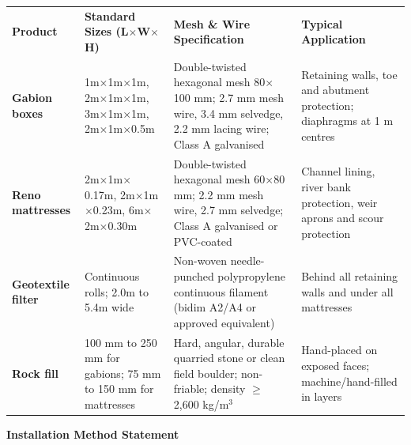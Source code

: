 {\fontsize{7.4pt}{9.0pt}\selectfont
\renewcommand{\arraystretch}{1.18}
\noindent
\begin{tabularx}{\textwidth}{@{}p{2.6cm} p{3.4cm} p{4.6cm} X@{}}
\rowcolor{mhnavy}
{\color{white}\bfseries Product} & {\color{white}\bfseries Standard Sizes (L$\times$W$\times$H)} & {\color{white}\bfseries Mesh \& Wire Specification} & {\color{white}\bfseries Typical Application} \\
\rowcolor{mhbluelight}
\bfseries Gabion boxes & 1m$\times$1m$\times$1m, 2m$\times$1m$\times$1m, 3m$\times$1m$\times$1m, 2m$\times$1m$\times$0.5m & Double-twisted hexagonal mesh 80$\times$100 mm; 2.7 mm mesh wire, 3.4 mm selvedge, 2.2 mm lacing wire; Class A galvanised & Retaining walls, toe and abutment protection; diaphragms at 1 m centres \\
\bfseries Reno mattresses & 2m$\times$1m$\times$0.17m, 2m$\times$1m$\times$0.23m, 6m$\times$2m$\times$0.30m & Double-twisted hexagonal mesh 60$\times$80 mm; 2.2 mm mesh wire, 2.7 mm selvedge; Class A galvanised or PVC-coated & Channel lining, river bank protection, weir aprons and scour protection \\
\rowcolor{mhbluelight}
\bfseries Geotextile filter & Continuous rolls; 2.0m to 5.4m wide & Non-woven needle-punched polypropylene continuous filament (bidim A2/A4 or approved equivalent) & Behind all retaining walls and under all mattresses \\
\bfseries Rock fill & 100 mm to 250 mm for gabions; 75 mm to 150 mm for mattresses & Hard, angular, durable quarried stone or clean field boulder; non-friable; density $\ge$ 2,600 kg/m$^3$ & Hand-placed on exposed faces; machine/hand-filled in layers \\
\end{tabularx}
\renewcommand{\arraystretch}{1}
}

\vfill

\noindent
{\large\bfseries\color{mhnavy} Installation Method Statement}
\vspace{0.08cm}

\noindent
\begin{minipage}[t]{0.185\textwidth}\end{minipage}\hfill
\begin{minipage}[t]{0.185\textwidth}\end{minipage}\hfill
\begin{minipage}[t]{0.185\textwidth}\end{minipage}\hfill
\begin{minipage}[t]{0.185\textwidth}\end{minipage}\hfill
\begin{minipage}[t]{0.185\textwidth}\end{minipage}

